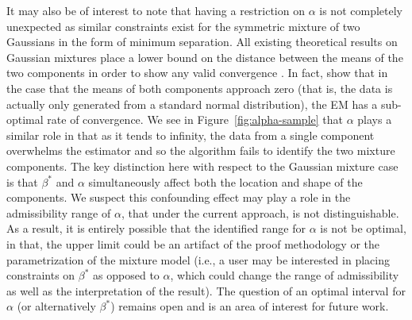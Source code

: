 \documentclass[runningheads]{llncs}
\begin{document}
It may also be of interest to note that having a restriction on $\alpha$ is not
completely unexpected as similar constraints exist for the symmetric mixture of
two Gaussians in the form of minimum separation. All
existing theoretical results on Gaussian mixtures place a lower bound on the
distance between the means of the two components in
order to show any valid convergence
\cite[amongst others]{wu2019randomly, kwon2020algorithm, daskalakis2017ten,
xu2016global}. In fact, \cite{wu2019randomly}
show that in the case that the means of both components
approach zero (that is, the data is actually only generated from a standard
normal distribution), the EM has a sub-optimal rate of convergence. We see in
Figure~\ref{fig:alpha-sample}
that $\alpha$ plays a similar role in that as it tends to infinity, the data
from a single component overwhelms the estimator and so the algorithm fails
to identify the two mixture components. The key distinction here with respect to
the Gaussian mixture case is that $\beta^*$ and $\alpha$ simultaneously affect
both the location and shape of the components. We suspect this confounding
effect may play a role in the admissibility range of $\alpha$, that under the
current approach, is not distinguishable.
As a result, it is entirely possible that the identified range for $\alpha$ is not
be optimal, in that, the upper limit could be an artifact of the proof
methodology or the parametrization of the mixture model (i.e., a user may be
interested in placing constraints on $\beta^*$ as opposed to $\alpha$, which
could change the range of admissibility as well as the interpretation of the
result). The question of an optimal interval for $\alpha$ (or alternatively
$\beta^*$) remains open and is an area of interest for future work.
\end{document}
